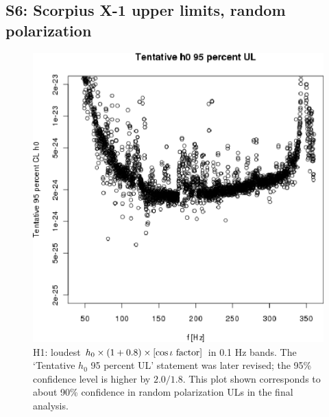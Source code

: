 \subsection{S6: Scorpius X-1 upper limits, random polarization}

\begin{figure}
\begin{center}
\includegraphics[width=0.68\paperwidth,height=0.48\paperheight]{plots/h0FullUL95logGuess-H1.eps}
\caption{
H1: loudest $h_0 \times \left( 1 + 0.8 \right) \times \left[\cos \iota \textup{ factor}\right]$ in 0.1 Hz bands. 
The `Tentative $h_0$ 95 percent UL' statement was later revised; the 95\% confidence level is higher by $2.0/1.8$.
This plot shown corresponds to about 90\% confidence in random polarization ULs in the final analysis.}
\label{S6_H1_UL}
\end{center}
\end{figure}

